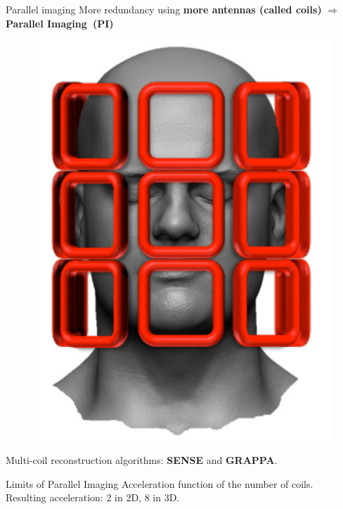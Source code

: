 \begin{frame}{Parallel imaging}
    More redundancy using \textbf{more antennas (called coils)} $\Rightarrow$ \textbf{Parallel Imaging~(PI)}
    \begin{figure}
        \centering
        \includegraphics[height=0.4\textheight]{Figures/intro_figures/multicoil.jpg}
    \end{figure}

    Multi-coil reconstruction algorithms: \textbf{SENSE} and \textbf{GRAPPA}.
\end{frame}



\begin{frame}{Limits of Parallel Imaging}
    Acceleration function of the number of coils.\\
    Resulting acceleration: 2 in 2D, 8 in 3D.
\end{frame}
